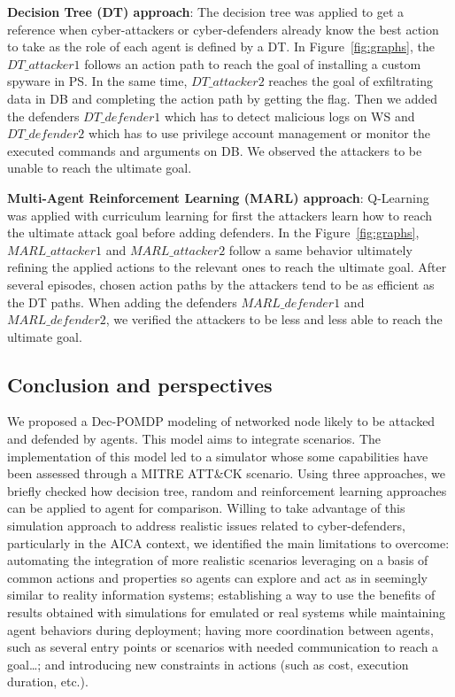 \noindent
\textbf{Decision Tree (DT) approach}: \quad The decision tree was applied to get a reference when cyber-attackers or cyber-defenders already know the best action to take as the role of each agent is defined by a DT.
In Figure~\ref{fig:graphs}, the $DT\_attacker1$ follows an action path to reach the goal of installing a custom spyware in PS. In the same time, $DT\_attacker2$ reaches the goal of exfiltrating data in DB and completing the action path by getting the flag. Then we added the defenders $DT\_defender1$ which has to detect malicious logs on WS and $DT\_defender2$ which has to use privilege account management or monitor the executed commands and arguments on DB. We observed the attackers to be unable to reach the ultimate goal.

\noindent
\textbf{Multi-Agent Reinforcement Learning (MARL) approach}: \quad Q-Learning~\cite{CWatkins1992} was applied with curriculum learning for first the attackers learn how to reach the ultimate attack goal before adding defenders.
In the Figure~\ref{fig:graphs}, $MARL\_attacker1$ and $MARL\_attacker2$ follow a same behavior ultimately refining the applied actions to the relevant ones to reach the ultimate goal. After several episodes, chosen action paths by the attackers tend to be as efficient as the DT paths. When adding the defenders $MARL\_defender1$ and $MARL\_defender2$, we verified the attackers to be less and less able to reach the ultimate goal.


\subsection{Conclusion and perspectives}

\noindent
We proposed a Dec-POMDP modeling of networked node likely to be attacked and defended by agents. This model aims to integrate scenarios. The implementation of this model led to a simulator whose some capabilities have been assessed through a MITRE ATT\&CK scenario. Using three approaches, we briefly checked how decision tree, random and reinforcement learning approaches can be applied to agent for comparison.
Willing to take advantage of this simulation approach to address realistic issues related to cyber-defenders, particularly in the AICA context, we identified the main limitations to overcome:
automating the integration of more realistic scenarios leveraging on a basis of common actions and properties so agents can explore and act as in seemingly similar to reality information systems;
establishing a way to use the benefits of results obtained with simulations for emulated or real systems while maintaining agent behaviors during deployment;
having more coordination between agents, such as several entry points or scenarios with needed communication to reach a goal\dots;
and introducing new constraints in actions (such as cost, execution duration, etc.).